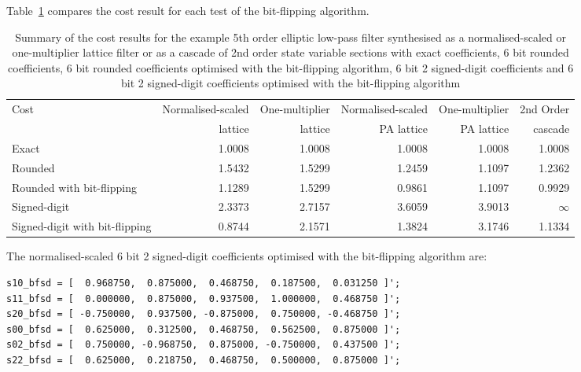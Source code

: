 \documentclass[a4paper,twoside,10pt,english]{report}
\begin{document}
Table~\ref{tab:bitflip-algorithm-cost-summary} compares the cost result for
each test of the bit-flipping algorithm.
\begin{table}[!hb]
\centering
\begin{threeparttable}
\begin{tabular}{lrrrrr} \toprule
Cost&Normalised-scaled&One-multiplier&Normalised-scaled&One-multiplier&2nd Order\\
&lattice&lattice&PA lattice&PA lattice& cascade\\
\midrule
Exact                          & 1.0008 & 1.0008 & 1.0008 & 1.0008 & 1.0008 \\
Rounded                        & 1.5432 & 1.5299 & 1.2459 & 1.1097 & 1.2362 \\
Rounded with bit-flipping      & 1.1289 & 1.5299 & 0.9861 & 1.1097 & 0.9929 \\
Signed-digit                   & 2.3373 & 2.7157 & 3.6059 & 3.9013 & $\infty$ \\
Signed-digit with bit-flipping & 0.8744 & 2.1571 & 1.3824 & 3.1746 & 1.1334 \\ 
\bottomrule
\end{tabular}
\end{threeparttable}
\caption[Summary of cost results for each bit-flipping algorithm example]
{Summary of the cost results for the example 5th order
elliptic low-pass filter synthesised as a normalised-scaled or one-multiplier 
lattice filter or as a cascade of 2nd order state variable sections 
with exact coefficients, 6 bit rounded coefficients,
6 bit rounded coefficients optimised with the bit-flipping algorithm,
6 bit 2 signed-digit coefficients and 6 bit 2 signed-digit coefficients 
optimised with the bit-flipping algorithm}
\label{tab:bitflip-algorithm-cost-summary}
\end{table}

The normalised-scaled 6 bit 2 signed-digit coefficients optimised with the
bit-flipping algorithm are:
\begin{small}
\begin{verbatim}
s10_bfsd = [  0.968750,  0.875000,  0.468750,  0.187500,  0.031250 ]';
s11_bfsd = [  0.000000,  0.875000,  0.937500,  1.000000,  0.468750 ]';
s20_bfsd = [ -0.750000,  0.937500, -0.875000,  0.750000, -0.468750 ]';
s00_bfsd = [  0.625000,  0.312500,  0.468750,  0.562500,  0.875000 ]';
s02_bfsd = [  0.750000, -0.968750,  0.875000, -0.750000,  0.437500 ]';
s22_bfsd = [  0.625000,  0.218750,  0.468750,  0.500000,  0.875000 ]';
\end{verbatim}
\end{small}
\end{document}
